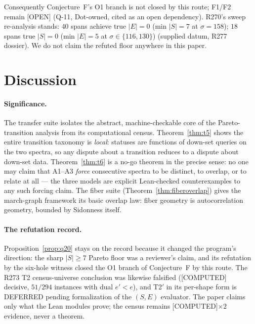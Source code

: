 \documentclass[11pt,a4paper]{article}
\theoremstyle{definition}
\begin{document}
Consequently Conjecture~F's O1 branch is not closed by this route;
F1/F2 remain [OPEN] (Q-11, Dot-owned, cited as an open dependency).
R270's sweep re-analysis stands: $40$ spans achieve true $|E|=0$
(min $|S|=7$ at $\sigma=158$); $18$ spans true $|S|=0$ (min $|E|=5$ at
$\sigma\in\{116,130\}$) (supplied datum, R277 dossier). We do not
claim the refuted floor anywhere in this paper.

\section{Discussion}

\paragraph{Significance.} The transfer suite isolates the abstract,
machine-checkable core of the Pareto-transition analysis from its
computational census. Theorem~\ref{thm:t5} shows the entire transition
taxonomy is \emph{local}: statuses are functions of down-set queries on
the two spectra, so any dispute about a transition reduces to a dispute
about down-set data. Theorem~\ref{thm:t6} is a no-go theorem in the
precise sense: no one may claim that A1--A3 \emph{force} consecutive
spectra to be distinct, to overlap, or to relate at all --- the three
models are explicit Lean-checked counterexamples to any such forcing
claim. The fiber suite (Theorem~\ref{thm:fiberoverlap}) gives the
march-graph framework its basic overlap law: fiber geometry is
autocorrelation geometry, bounded by Sidonness itself.

\paragraph{The refutation record.} Proposition~\ref{prop:q20} stays on
the record because it changed the program's direction: the sharp
$|S|\ge7$ Pareto floor was a reviewer's claim, and its refutation by
the six-hole witness closed the O1 branch of Conjecture~F by this
route. The R273 T2 census-universe conclusion was likewise falsified
([COMPUTED] decisive, $51/294$ instances with dual $e'<e$), and T2$'$
in its per-shape form is DEFERRED pending formalization of the $(S,E)$
evaluator. The paper claims only what the Lean modules prove; the
census remains [COMPUTED]$\times2$ evidence, never a theorem.
\end{document}
